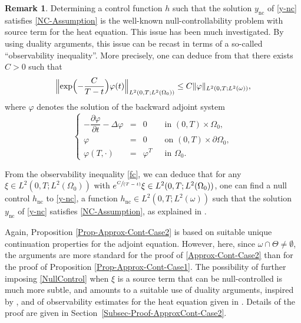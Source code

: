 \documentclass[JEP,XML,SOM,Unicode,NoFloatCountersInSection]{cedram}
\newcommand{\spfrac}[2]{\sfrac{#1}{(#2)}}
\newcommand{\nc}{\mathrm{nc}}
\newcommand{\Bnorm}[1]{\Bigl\Vert#1\Bigr\Vert}
\theoremstyle{definition}
\newtheorem{remark}[theorem]{Remark}
\begin{document}
\begin{remark}
Determining a control function $h$ such that the solution $y_{\nc}$ of \eqref{y-nc} satisfies \eqref{NC-Assumption} is the well-known null-controllability problem with source term for the heat equation. This issue has been much investigated. By using duality arguments, this issue can be recast in terms of a so-called ``observability inequality''. More precisely, one can deduce from \cite[Lem.\,2.1]{FursikovImanuvilov} that there exists $C>0$ such that
\begin{equation}\label{fc}
\Bnorm{\exp\Bigl(- \frac{C}{T-t}\Bigr)\varphi(t)}_ {L^2(0,T; L^2(\Omega_0))} \leq C \| \varphi \|_{L^2(0,T; L^2(\omega))},
\end{equation}
where $\varphi$ denotes the solution of the backward adjoint system
\begin{equation*}
\left\{
\begin{array}{rcll}
-\dfrac{\partial \varphi}{\partial t}-\Delta \varphi &=&0 \quad&\text{ in }(0,T) \times \Omega_0,
\\
\varphi &=& 0 &\text{ on }(0,T) \times \partial \Omega_0,
\\
\varphi\left(T,\cdot\right) &=& \varphi^T &\text{ in }\Omega_0.
\end{array}
\right.
\end{equation*}

From the observability inequality \eqref{fc}, we can deduce that for any $\xi\in L^2(0,T; L^2(\Omega_0))$ with $e^{\spfrac{C}{T-t}}\xi \in L^2(0,T; L^2(\Omega_0))$, one can find a null control $h_{\nc}$ to \eqref{y-nc}, \ie a function $h_{\nc} \in L^2(0,T; L^2(\omega))$ such that the solution $y_{\nc}$ of \eqref{y-nc} satisfies \eqref{NC-Assumption}, as explained in \cite[Proof of Th.\,2.1]{FursikovImanuvilov}.
\end{remark}

Again, Proposition \ref{Prop-Approx-Cont-Case2} is based on suitable unique continuation properties for the adjoint equation. However, here, since $\omega \cap \Theta \neq\emptyset$, the arguments are more standard for the proof of \eqref{Approx-Cont-Case2} {than for the proof of Proposition \ref{Prop-Approx-Cont-Case1}}. The possibility of further imposing \eqref{NullControl} when $\xi$ is a source term that can be null-controlled is much more subtle, and amounts to a suitable use of duality arguments, inspired by \cite{Lions-1992}, and of observability estimates for the heat equation given in \cite{FursikovImanuvilov}. Details of the proof are given in Section~\ref{Subsec-Proof-ApproxCont-Case2}.
\end{document}
